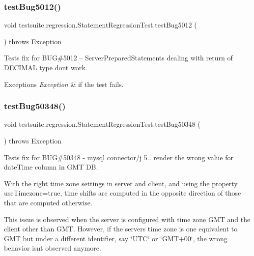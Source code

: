 \subsubsection{\texorpdfstring{test\+Bug5012()}{testBug5012()}}
{\footnotesize\ttfamily void testsuite.\+regression.\+Statement\+Regression\+Test.\+test\+Bug5012 (\begin{DoxyParamCaption}{ }\end{DoxyParamCaption}) throws Exception}

Tests fix for B\+UG\#5012 -- Server\+Prepared\+Statements dealing with return of D\+E\+C\+I\+M\+AL type don\textquotesingle{}t work.


\begin{DoxyExceptions}{Exceptions}
{\em Exception} & if the test fails. \\
\hline
\end{DoxyExceptions}
\mbox{\label{classtestsuite_1_1regression_1_1_statement_regression_test_a2b6b5d2943bee507e1d7495e883ae9c5}} 
\subsubsection{\texorpdfstring{test\+Bug50348()}{testBug50348()}}
{\footnotesize\ttfamily void testsuite.\+regression.\+Statement\+Regression\+Test.\+test\+Bug50348 (\begin{DoxyParamCaption}{ }\end{DoxyParamCaption}) throws Exception}

Tests fix for B\+UG\#50348 -\/ mysql connector/j 5.. render the wrong value for date\+Time column in G\+MT DB.

With the right time zone settings in server and client, and using the property \textquotesingle{}use\+Timezone=true\textquotesingle{}, time shifts are computed in the opposite direction of those that are computed otherwise.

This issue is observed when the server is configured with time zone \textquotesingle{}G\+MT\textquotesingle{} and the client other than \textquotesingle{}G\+MT\textquotesingle{}. However, if the server\textquotesingle{}s time zone is one equivalent to \textquotesingle{}G\+MT\textquotesingle{} but under a different identifier, say \char`\"{}\+U\+T\+C\char`\"{} or \char`\"{}\+G\+M\+T+00\char`\"{}, the wrong behavior isn\textquotesingle{}t observed anymore. \mbox{\label{classtestsuite_1_1regression_1_1_statement_regression_test_aebe0b100ad408b0b92fc1c55d590e08e}} 
